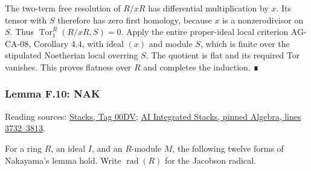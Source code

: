\documentclass[11pt,a4paper,openany]{report}
\begin{document}
The two-term free resolution of \(R/xR\) has differential multiplication by \(x\). Its tensor with \(S\) therefore has zero first homology, because \(x\) is a nonzerodivisor on \(S\). Thus \(\operatorname{Tor}_1^R(R/xR,S)=0\). Apply the entire proper-ideal local criterion AG-CA-08, Corollary 4.4, with ideal \((x)\) and module \(S\), which is finite over the stipulated Noetherian local overring \(S\). The quotient is flat and its required Tor vanishes. This proves flatness over \(R\) and completes the induction. ∎

\label{AG-RG-S05-algebra-lemma-NAK}

\subsubsection{Lemma F.10: NAK}\label{AG-RG-S05-lemma-f.10-nak}

Reading sources: \href{https://stacks.math.columbia.edu/tag/00DV}{Stacks, Tag 00DV}; \href{https://github.com/KokunoYumeto/unofficial-stacks-project-ai-drafts/blob/565b10e987aba5969b21145a0833f42d69f96790/algebra.tex\#L3732-L3813}{AI Integrated Stacks, pinned Algebra, lines 3732--3813}.

For a ring \(R\), an ideal \(I\), and an \(R\)-module \(M\), the following twelve forms of Nakayama's lemma hold. Write \(\operatorname{rad}(R)\) for the Jacobson radical.
\end{document}
